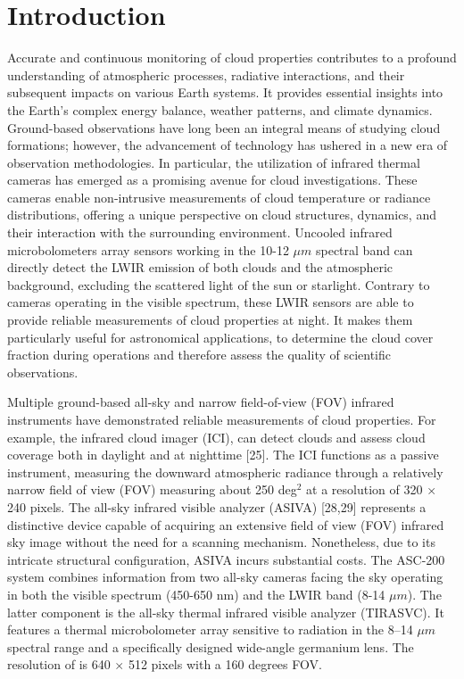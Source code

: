 \documentclass[remotesensing,article,submit,pdftex,moreauthors]{Definitions/mdpi}
\begin{document}

\section{Introduction}

Accurate and continuous monitoring of cloud properties contributes to a profound understanding of atmospheric processes, radiative interactions, and their subsequent impacts on various Earth systems.
It provides essential insights into the Earth's complex energy balance, weather patterns, and climate dynamics. Ground-based observations have long been an integral means of studying cloud formations; however, the advancement of technology has ushered in a new era of observation methodologies. In particular, the utilization of infrared thermal cameras has emerged as a promising avenue for cloud investigations. These cameras enable non-intrusive measurements of cloud temperature or radiance distributions, offering a unique perspective on cloud structures, dynamics, and their interaction with the surrounding environment. Uncooled infrared microbolometers array sensors working in the 10-12 $\mu m$ spectral band can directly detect the LWIR emission of both clouds and the atmospheric background, excluding the scattered light of the sun or starlight. Contrary to cameras operating in the visible spectrum, these LWIR sensors are able to provide reliable measurements of cloud properties at night. It makes them particularly useful for astronomical applications, to determine the cloud cover fraction during operations and therefore assess the quality of scientific observations.

Multiple ground-based all-sky and narrow field-of-view (FOV) infrared instruments have demonstrated reliable measurements of cloud properties. For example, the infrared cloud imager (ICI), can detect clouds and assess cloud coverage both in daylight and at nighttime [25]. The ICI functions as a passive instrument, measuring the downward atmospheric radiance through a relatively narrow field of view (FOV) measuring about 250 deg$^{2}$ at a resolution of 320 × 240 pixels. The all-sky infrared visible analyzer (ASIVA) [28,29] represents a distinctive device capable of acquiring an extensive field of view (FOV) infrared sky image without the need for a scanning mechanism. Nonetheless, due to its intricate structural configuration, ASIVA incurs substantial costs. The ASC-200 system combines information from two all-sky cameras facing the sky operating in both the visible spectrum (450-650 nm) and the LWIR band (8-14 $\mu m$). The latter  component is the all-sky thermal infrared visible analyzer (TIRASVC). It features a thermal microbolometer array sensitive to radiation in the 8–14 $\mu m$ spectral range and a specifically designed wide-angle germanium lens. The resolution of is 640 $\times$ 512 pixels with a 160 degrees FOV.
\end{document}
